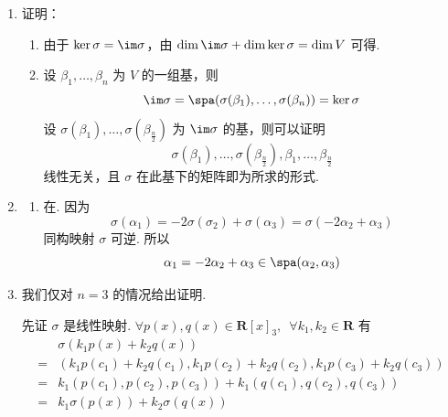 \begin{enumerate}
    \item 证明：\begin{enumerate}
              \item 由于 $ \ker \sigma = \im \sigma $，由 $ \dim \im \sigma + \dim \ker \sigma = \dim V $ 可得.

              \item 设 $ \beta_1, \ldots, \beta_n $ 为 $ V $ 的一组基，则
                    \[ \im \sigma = \spa(\sigma(\beta_1), \ldots, \sigma(\beta_n)) = \ker \sigma \]
                    设 $ \sigma(\beta_1), \ldots, \sigma(\beta_{\frac{n}{2}}) $ 为 $ \im \sigma $ 的基，则可以证明
                    \[ \sigma(\beta_1), \ldots, \sigma(\beta_{\frac{n}{2}}), \beta_1, \ldots, \beta_{\frac{n}{2}} \]
                    线性无关，且 $ \sigma $ 在此基下的矩阵即为所求的形式.
          \end{enumerate}

    \item \begin{enumerate}
              \item 在. 因为
                    \[ \sigma(\alpha_1) = -2 \sigma(\sigma_2) + \sigma(\alpha_3) = \sigma(-2 \alpha_2 + \alpha_3) \]
                    同构映射 $ \sigma $ 可逆. 所以
                    \[ \alpha_1 = -2 \alpha_2 + \alpha_3 \in \spa(\alpha_2, \alpha_3) \]
          \end{enumerate}

    \item 我们仅对 $ n = 3 $ 的情况给出证明. %

          先证 $ \sigma $ 是线性映射. $ \forall p(x), q(x) \in \mathbf{R}[x]_3,\enspace \forall k_1, k_2 \in \mathbf{R} $ 有
          \begin{align*}
                  & \sigma(k_1 p(x) + k_2 q(x))                                                 \\
              ={} & (k_1 p(c_1) + k_2 q(c_1), k_1 p(c_2) + k_2 q(c_2), k_1 p(c_3) + k_2 q(c_3)) \\
              ={} & k_1(p(c_1), p(c_2), p(c_3)) + k_1(q(c_1), q(c_2), q(c_3))                   \\
              ={} & k_1 \sigma(p(x)) + k_2 \sigma(q(x))
          \end{align*}


\end{enumerate}
